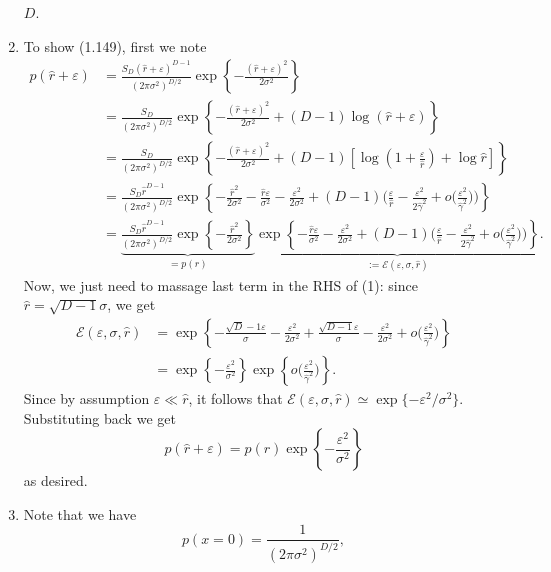 \begin{enumerate}[leftmargin={*}]
$D$. 
\item To show (1.149), first we note 
\begin{align*}
p(\hat{r}+\varepsilon) & =\frac{S_{D}(\hat{r}+\varepsilon)^{D-1}}{(2\pi\sigma^{2})^{D/2}}\exp\left\{ -\frac{(\hat{r}+\varepsilon)^{2}}{2\sigma^{2}}\right\} \\
 & =\frac{S_{D}}{(2\pi\sigma^{2})^{D/2}}\exp\left\{ -\frac{(\hat{r}+\varepsilon)^{2}}{2\sigma^{2}}+(D-1)\log(\hat{r}+\varepsilon)\right\} \\
 & =\frac{S_{D}}{(2\pi\sigma^{2})^{D/2}}\exp\left\{ -\frac{(\hat{r}+\varepsilon)^{2}}{2\sigma^{2}}+(D-1)\left[\log\left(1+\frac{\varepsilon}{\hat{r}}\right)+\log\hat{r}\right]\right\} \\
 & =\frac{S_{D}\hat{r}^{D-1}}{(2\pi\sigma^{2})^{D/2}}\exp\left\{ -\frac{\hat{r}^{2}}{2\sigma^{2}}-\frac{\hat{r}\varepsilon}{\sigma^{2}}-\frac{\varepsilon^{2}}{2\sigma^{2}}+(D-1)\bigg(\frac{\varepsilon}{\hat{r}}-\frac{\varepsilon^{2}}{2\hat{\gamma}^{2}}+o\bigg(\frac{\varepsilon^{2}}{\hat{\gamma}^{2}}\bigg)\bigg)\right\} \\
 & =\underbrace{\frac{S_{D}\hat{r}^{D-1}}{(2\pi\sigma^{2})^{D/2}}\exp\left\{ -\frac{\hat{r}^{2}}{2\sigma^{2}}\right\} }_{=p(r)}\underbrace{\exp\left\{ -\frac{\hat{r}\varepsilon}{\sigma^{2}}-\frac{\varepsilon^{2}}{2\sigma^{2}}+(D-1)\bigg(\frac{\varepsilon}{\hat{r}}-\frac{\varepsilon^{2}}{2\hat{\gamma}^{2}}+o\bigg(\frac{\varepsilon^{2}}{\hat{\gamma}^{2}}\bigg)\bigg)\right\} }_{:=\mathcal{E}(\varepsilon,\sigma,\hat{r})}\tag{1}.
\end{align*}
Now, we just need to massage last term in the RHS of (1): since $\hat{r}=\sqrt{D-1}\sigma$,
we get 
\begin{align*}
\mathcal{E}(\varepsilon,\sigma,\hat{r}) & =\exp\left\{ -\frac{\sqrt{D}-1\varepsilon}{\sigma}-\frac{\varepsilon^{2}}{2\sigma^{2}}+\frac{\sqrt{D-1}\varepsilon}{\sigma}-\frac{\varepsilon^{2}}{2\sigma^{2}}+o\bigg(\frac{\varepsilon^{2}}{\hat{\gamma}^{2}}\bigg)\right\} \\
 & =\exp\left\{ -\frac{\varepsilon^{2}}{\sigma^{2}}\right\} \exp\left\{ o\bigg(\frac{\varepsilon^{2}}{\hat{\gamma}^{2}}\bigg)\right\} .
\end{align*}
Since by assumption $\varepsilon\ll\hat{r}$, it follows that $\mathcal{E}(\varepsilon,\sigma,\hat{r})\simeq\exp\{-\varepsilon^{2}/\sigma^{2}\}.$
Substituting back we get 
\[
p(\hat{r}+\varepsilon)=p(r)\exp\left\{ -\frac{\varepsilon^{2}}{\sigma^{2}}\right\} 
\]
as desired. 
\item Note that we have 
\[
p(x=0)=\frac{1}{(2\pi\sigma^{2})^{D/2}},
\]
\end{enumerate}

